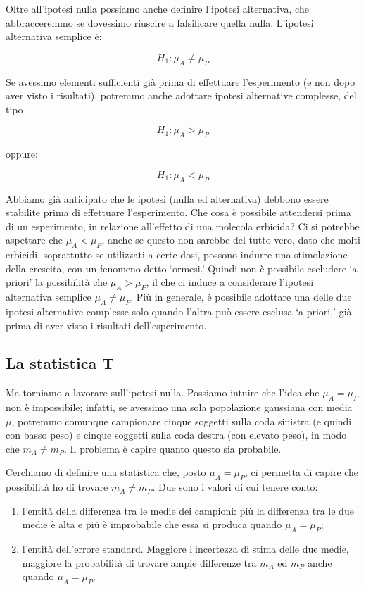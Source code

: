 \documentclass[a4paper,12pt,oneside]{book}
\providecommand{\tightlist}{%
  \setlength{\itemsep}{0pt}\setlength{\parskip}{0pt}}
\begin{document}
Oltre all'ipotesi nulla possiamo anche definire l'ipotesi alternativa, che abbracceremmo se dovessimo riuscire a falsificare quella nulla. L'ipotesi alternativa semplice è:

\[H_1 :\mu_A  \ne \mu_P\]

Se avessimo elementi sufficienti già prima di effettuare l'esperimento (e non dopo aver visto i risultati), potremmo anche adottare ipotesi alternative complesse, del tipo

\[H_1 :\mu_A  > \mu_P\]

oppure:

\[H_1 :\mu_A  < \mu_P\]

Abbiamo già anticipato che le ipotesi (nulla ed alternativa) debbono essere stabilite prima di effettuare l'esperimento. Che cosa è possibile attendersi prima di un esperimento, in relazione all'effetto di una molecola erbicida? Ci si potrebbe aspettare che \(\mu_A < \mu_P\), anche se questo non sarebbe del tutto vero, dato che molti erbicidi, soprattutto se utilizzati a certe dosi, possono indurre una stimolazione della crescita, con un fenomeno detto `ormesi.' Quindi non è possibile escludere `a priori' la possibilità che \(\mu_A > \mu_P\), il che ci induce a considerare l'ipotesi alternativa semplice \(\mu_A \neq \mu_P\). Più in generale, è possibile adottare una delle due ipotesi alternative complesse solo quando l'altra può essere esclusa `a priori,' già prima di aver visto i risultati dell'esperimento.

\hypertarget{la-statistica-t}{%
\subsection{La statistica T}\label{la-statistica-t}}

Ma torniamo a lavorare sull'ipotesi nulla. Possiamo intuire che l'idea che \(\mu_A = \mu_P\) non è impossibile; infatti, se avessimo una sola popolazione gaussiana con media \(\mu\), potremmo comunque campionare cinque soggetti sulla coda sinistra (e quindi con basso peso) e cinque soggetti sulla coda destra (con elevato peso), in modo che \(m_A \neq m_P\). Il problema è capire quanto questo sia probabile.

Cerchiamo di definire una statistica che, posto \(\mu_A = \mu_P\), ci permetta di capire che possibilità ho di trovare \(m_A \neq m_P\). Due sono i valori di cui tenere conto:

\begin{enumerate}
\def\labelenumi{\arabic{enumi}.}
\tightlist
\item
  l'entità della differenza tra le medie dei campioni: più la differenza tra le due medie è alta e più è improbabile che essa si produca quando \(\mu_A = \mu_P\);
\item
  l'entità dell'errore standard. Maggiore l'incertezza di stima delle due medie, maggiore la probabilità di trovare ampie differenze tra \(m_A\) ed \(m_P\) anche quando \(\mu_A = \mu_P\).
\end{enumerate}
\end{document}
